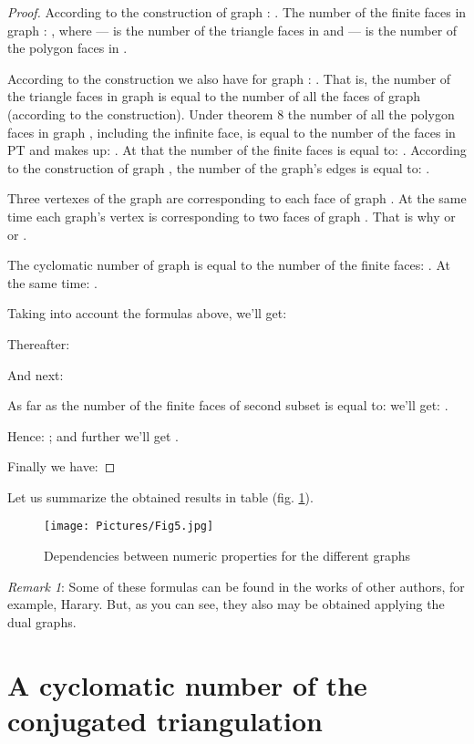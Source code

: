 \documentclass{amsart}
\theoremstyle{plain}
\numberwithin{equation}{section}
\begin{document}
\begin{proof}
According to the construction of graph : . The number of the finite faces in graph : , where  --- is the number of the triangle faces in  and  --- is the number of the polygon faces in .

According to the construction we also have for graph : . That is, the number of the triangle faces  in graph  is equal to the number of all the faces  of graph  (according to the construction). Under theorem 8 the number of all the polygon faces in graph , including the infinite face, is equal to the number of the faces in PT and makes up: . At that the number of the finite faces is equal to: . According to the construction of graph , the number of the graph's edges is equal to: .

Three vertexes  of the graph  are corresponding to each face  of graph . At the same time each graph's  vertex is corresponding to two faces of graph . That is why  or  or .

The cyclomatic number of graph  is equal to the number of the finite faces: . At the same time: .

Taking into account the formulas above, we'll get:

Thereafter: 

And next: 

As far as the number of the finite faces of second subset is equal to:  we'll get: . 

Hence: ; and further we'll get . 

Finally we have: 
 

\end{proof}

Let us summarize the obtained results in table (fig. \ref{Fig:5}). 

\begin{figure}[htb]
		\texttt{[image: Pictures/Fig5.jpg]}
	\caption{Dependencies between numeric properties for the different graphs}
	\label{Fig:5}
\end{figure}

\textit{Remark 1}: Some of these formulas can be found in the works of other authors, for example, Harary. But, as you can see, they also may be obtained applying the dual graphs.

\section {A cyclomatic number of the conjugated triangulation}
\end{document}
